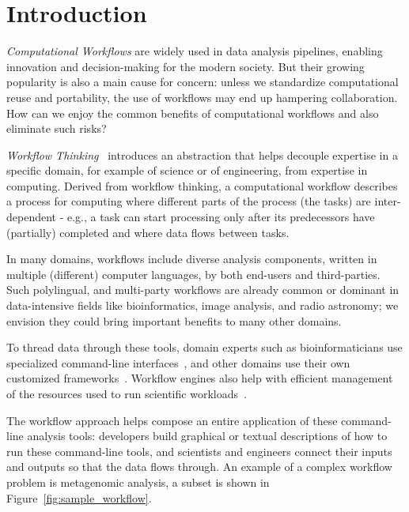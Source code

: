 \documentclass[sigconf,authordraft]{acmart}
\begin{document}
\maketitle

\section{Introduction}
\textit{Computational Workflows} are widely used in data analysis pipelines, enabling innovation and decision-making for the modern society. But their growing popularity is also a main cause for concern: unless we standardize computational reuse and portability, the use of workflows may end up hampering collaboration. How can we enjoy the common benefits of computational workflows and also eliminate such risks?

\textit{Workflow Thinking}~\cite{gryk_workflows_2017} introduces an abstraction that helps decouple expertise in a specific domain, for example of science or of engineering, from expertise in computing. Derived from workflow thinking, a computational workflow describes a process for computing where different parts of the process (the tasks) are inter-dependent - e.g., a task can start processing only after its predecessors have (partially) completed and where data flows between tasks.

In many domains, workflows include diverse analysis components, written in multiple (different) computer languages, by both end-users and third-parties. Such polylingual, and multi-party workflows are already common or dominant in data-intensive fields like bioinformatics, image analysis, and radio astronomy; we envision they could bring important benefits to many other domains.

To thread data through these tools, domain experts such as bioinformaticians use specialized command-line interfaces~\cite{seemann_ten_2013,georgeson_bionitio_2019}, and other domains use their own customized frameworks~\cite{babuji_parsl_2019,berthold_knime_2009}. Workflow engines also help with efficient management of the resources used to run scientific workloads~\cite{deelman_pegasus_2015,couvares_workflow_2007}.

The workflow approach helps compose an entire application of these command-line analysis tools: developers build graphical or textual descriptions of how to run these command-line tools, and scientists and engineers connect their inputs and outputs so that the data flows through. An example of a complex workflow problem is metagenomic analysis, a subset is shown in Figure~\ref{fig:sample_workflow}.
\end{document}
